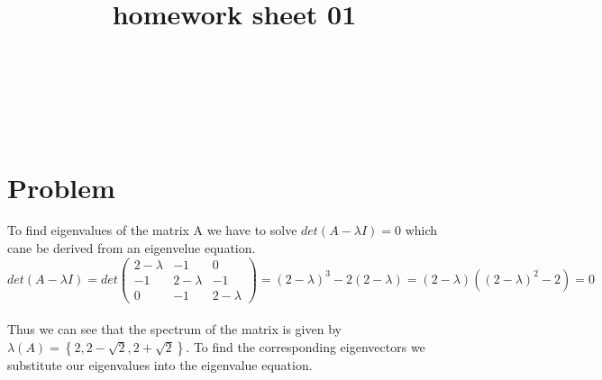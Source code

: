 \documentclass{article}
\title{homework sheet 01}
\author{
	\name{Denys Sobchyshak}\\
	\imat{03636581}\\
	\email{denys.sobchyshak@gmail.com}
	\And
	\name{Sergey Zakharov}\\
	\imat{03636642}\\
	\email{ga39pad@mytum.de}
}
\begin{document}
	\maketitle
	
	\section{Problem}
	To find eigenvalues of the matrix A we have to solve $ det(A-\lambda I)=0 $ which cane be derived from an eigenvelue equation. \\
	\[
	det(A-\lambda I)= det
	\begin{pmatrix} 
		2-\lambda & -1 & 0  \\ 
		-1 & 2-\lambda & -1 \\
		0 & -1 & 2-\lambda
	\end{pmatrix}
	=(2-\lambda)^3-2(2-\lambda)=(2-\lambda)((2-\lambda)^2-2)=0
	\]\\
	Thus we can see that the spectrum of the matrix is given by $\lambda(A)=\left\{2, 2-\sqrt{2},2+\sqrt{2}\right\}$. To find the corresponding eigenvectors we substitute our eigenvalues into the eigenvalue equation.\\
\end{document}
